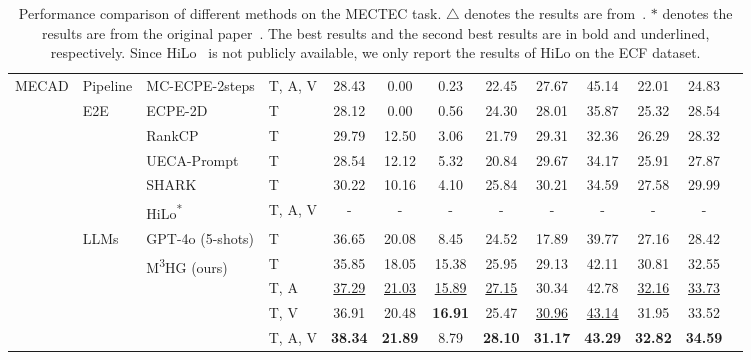 \documentclass[11pt]{article}
\begin{document}
\begin{table}[htbp]
\begin{tabular}{llllccccccccc}
        \cmidrule{1-12}
        \multirow{13}{*}{MECAD} 
        & Pipeline & MC-ECPE-2steps & T, A, V & 28.43 & 0.00 & 0.23 & 22.45 & 27.67 & 45.14 & 22.01 & 24.83 \\
        \cmidrule{2-12}
        & \multirow{5}{*}{E2E} 
        & ECPE-2D & T & 28.12 & 0.00 & 0.56 & 24.30 & 28.01 & 35.87 & 25.32 & 28.54 \\
        & & RankCP & T & 29.79 & 12.50 & 3.06  & 21.79 & 29.31 & 32.36 & 26.29 & 28.32 \\
        & & UECA-Prompt & T &  28.54 & 12.12 & 5.32 & 20.84 & 29.67 & 34.17 & 25.91 & 27.87 \\
        & & SHARK & T & 30.22 & 10.16 & 4.10 & 25.84 & 30.21 & 34.59 & 27.58 & 29.99 \\
        & & HiLo\textsuperscript{*} & T, A, V &-&-&-&-&-&-& - & - \\
        \cmidrule{2-12}
        & \multirow{1}{*}{LLMs}
        & GPT-4o (5-shots) & T & 36.65 & 20.08 & 8.45 & 24.52 & 17.89 & 39.77 & 27.16 & 28.42 \\
       \cmidrule{2-12}
       & \multirow{4}{*}{}
       & \multirow{4}{*}{M\textsuperscript{3}HG (ours)} 
       & T & 35.85 & 18.05 & 15.38 & 25.95 & 29.13 & 42.11 & 30.81 & 32.55\\
       & & & T, A & \underline{37.29} & \underline{21.03} & \underline{15.89} & \underline{27.15}  &  30.34 & 42.78 & \underline{32.16} & \underline{33.73} \\
       & & & T, V & 36.91 & 20.48 & \textbf{16.91} & 25.47  & \underline{30.96} & \underline{43.14} & 31.95 & 33.52\\
       & & & T, A, V & \textbf{38.34} & \textbf{21.89} & 8.79 & \textbf{28.10} &  \textbf{31.17} & \textbf{43.29} & \textbf{32.82} & \textbf{34.59} \\
        \bottomrule
    \end{tabular}
    \caption{Performance comparison of different methods on the MECTEC task.
    $\triangle$ denotes the results are from~\cite{wang2023generative}. $*$ denotes the results are from the original paper~\cite{wang2023generative, li2024multimodal}. The best results and the second best results are in bold and underlined, respectively. Since HiLo~\cite{li2024multimodal} is not publicly available, we only report the results of HiLo on the ECF dataset.}
    \label{table:exp}
    \vspace{-2mm}
\end{table} 
\end{document}
